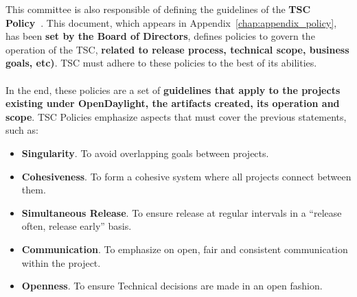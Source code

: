 \documentclass[a4paper, 12pt]{book}
\begin{document}
This committee is also responsible of defining the guidelines of the \textbf{TSC Policy~\cite{OpenDaylightTSCPolicy}}. This document, which appears in Appendix~\ref{chap:appendix_policy}, has been \textbf{set by the Board of Directors}, defines policies to govern the operation of the TSC, \textbf{related to release process, technical scope, business goals, etc)}. TSC must adhere to these policies to the best of its abilities.\\
\\
In the end, these policies are a set of \textbf{guidelines that apply to the projects existing under OpenDaylight, the artifacts created, its operation and scope}. TSC Policies emphasize aspects that must cover the previous statements, such as:
\begin{itemize}\itemsep0pt
\item{\textbf{Singularity}}. To avoid overlapping goals between projects.
\item{\textbf{Cohesiveness}}. To form a cohesive system where all projects connect between them.
\item{\textbf{Simultaneous Release}}. To ensure release at regular intervals in a ``release often, release early'' basis.
\item{\textbf{Communication}}.  To emphasize on open, fair and consistent communication within the project.
\item{\textbf{Openness}}. To ensure Technical decisions are made in an open fashion.
\end{itemize}
\end{document}
